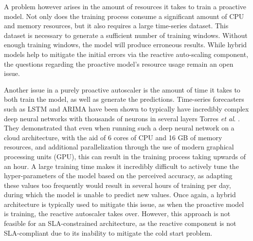 A problem however arises in the amount of resources it takes to train a proactive model. Not only does the training process consume a significant amount of CPU and memory resources, but it also requires a large time-series dataset. This dataset is necessary to generate a sufficient number of training windows. Without enough training windows, the model will produce erroneous results. While hybrid models help to mitigate the initial errors via the reactive auto-scaling component, the questions regarding the proactive model's resource usage remain an open issue.\par


Another issue in a purely proactive autoscaler is the amount of time it takes to both train the model, as well as generate the predictions. Time-series forecasters such as LSTM and ARIMA have been shown to typically have incredibly complex deep neural networks with thousands of neurons in several layers Torres \textit{et al}. \cite{torres2021deep}. They demonstrated that even when running such a deep neural network on a cloud architecture, with the aid of 6 cores of CPU and 16 GB of memory resources, and additional parallelization through the use of modern graphical processing units (GPU), this can result in the training process taking upwards of an hour. A large training time makes it incredibly difficult to actively tune the hyper-parameters of the model based on the perceived accuracy, as adapting these values too frequently would result in several hours of training per day, during which the model is unable to predict new values. Once again, a hybrid architecture is typically used to mitigate this issue, as when the proactive model is training, the reactive autoscaler takes over. However, this approach is not feasible for an SLA-constrained architecture, as the reactive component is not SLA-compliant due to its inability to mitigate the cold start problem.\par


